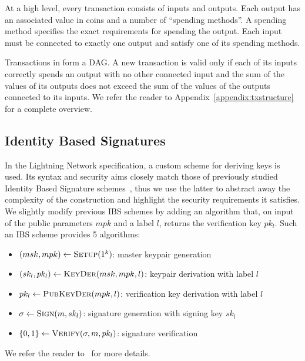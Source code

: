     At a high level, every transaction consists of inputs and outputs. Each
    output has an associated value in coins and a number of ``spending
    methods''. A spending method specifies the exact requirements for spending
    the output. Each input must be connected to exactly one output and satisfy
    one of its spending methods.

    Transactions in \ledger{} form a DAG. A new transaction is valid only if
    each of its inputs correctly spends an output with no other connected input
    and the sum of the values of its outputs does not exceed the sum of the
    values of the outputs connected to its inputs. We refer the reader to
    Appendix~\ref{appendix:txstructure} for a complete overview.

  \subsection{Identity Based Signatures}
    In the Lightning Network specification, a custom scheme for deriving keys is
    used. Its syntax and security aims closely match those of previously studied
    Identity Based Signature schemes~\cite{ibsshamir,ibspaterson}, thus we use
    the latter to abstract away the complexity of the construction and highlight
    the security requirements it satisfies. We slightly modify previous IBS
    schemes by adding an algorithm that, on input of the public parameters $mpk$
    and a label $l$, returns the verification key $pk_l$. Such an IBS scheme
    provides 5 algorithms:
    \begin{itemize}
      \item $(msk, mpk) \leftarrow \textsc{Setup}(1^k)$: master keypair
      generation
      \item $(sk_l, pk_l) \leftarrow \textsc{KeyDer}(msk, mpk, l)$: keypair
      derivation with label $l$
      \item $pk_l \leftarrow \textsc{PubKeyDer}(mpk, l)$: verification key
      derivation with label $l$
      \item $\sigma \leftarrow \textsc{Sign}(m, sk_l)$: signature generation
      with signing key $sk_l$
      \item $\{0, 1\} \leftarrow \textsc{Verify}(\sigma, m, pk_l)$: signature
      verification
    \end{itemize}
    We refer the reader to~\cite{ibspaterson} for more details.  
